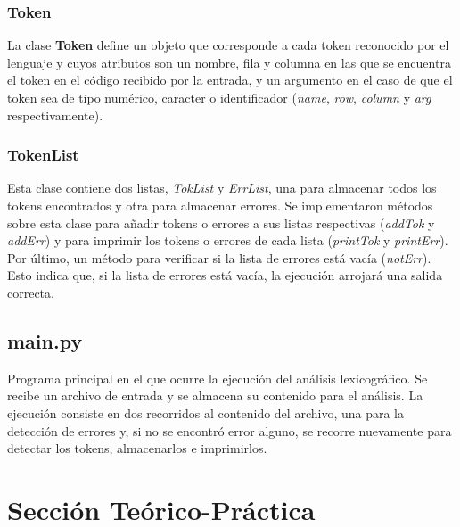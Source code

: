 \documentclass[a4paper, 10pt]{article}
\begin{document}
			\subsubsection{Token}
			
				\par
				\medskip
				La clase \textbf{Token} define un objeto que corresponde a cada token reconocido
				por el lenguaje y cuyos atributos son un nombre, fila y columna en las que se 
				encuentra el token en el código recibido por la entrada, y un argumento en el caso
				de que el token sea de tipo numérico, caracter o identificador (\textit{name}, \textit{row},
				\textit{column} y \textit{arg} respectivamente).
			
			\subsubsection{TokenList}
			
				\par
				\medskip
				Esta clase contiene dos listas, \textit{TokList} y \textit{ErrList}, una para almacenar
				todos los tokens encontrados y otra para almacenar errores. Se implementaron métodos sobre
				esta clase para añadir tokens o errores a sus listas respectivas (\textit{addTok} y \textit{addErr}) 
				y para imprimir los tokens o errores de cada lista (\textit{printTok} y \textit{printErr}). 
				Por último, un método para verificar si la lista de errores está vacía (\textit{notErr}). 
				Esto indica que, si la lista de errores está vacía, la ejecución arrojará una salida correcta.
			
		\subsection{main.py}
			
			\par
			\medskip
			Programa principal en el que ocurre la ejecución del análisis lexicográfico. Se recibe un 
			archivo de entrada y se almacena su contenido para el análisis. La ejecución consiste en dos
			recorridos al contenido del archivo, una para la detección de errores y, si no se encontró
			error alguno, se recorre nuevamente para detectar los tokens, almacenarlos e imprimirlos.
	
	\newpage			
	\section{Sección Teórico-Práctica}
		
\end{document}
